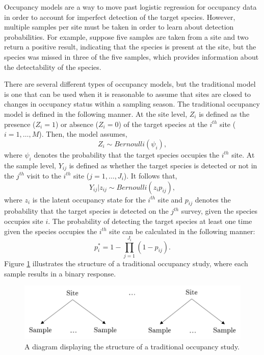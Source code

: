 \documentclass[12pt]{article}\usepackage[]{graphicx}\usepackage[]{color}
\begin{document}
Occupancy models are a way to move past logistic regression for occupancy data in order to account for imperfect detection of the target species. However, multiple samples per site must be taken in order to learn about detection probabilities. For example, suppose five samples are taken from a site and two return a positive result, indicating that the species is present at the site, but the species was missed in three of the five samples, which provides information about the detectability of the species. 

There are several different types of occupancy models, but the traditional model is one that can be used when it is reasonable to assume that sites are closed to changes in occupancy status within a sampling season. The traditional occupancy model is defined in the following manner. At the site level, $Z_i$ is defined as the presence ($Z_i = 1$) or absence ($Z_i = 0$) of the target species at the $i^{th}$ site ($i = 1, \dots, M$). Then, the model assumes, 
$$Z_i \sim Bernoulli(\psi_i),$$ 
\noindent where $\psi_i$ denotes the probability that the target species occupies the $i^{th}$ site. At the sample level, $Y_{ij}$ is defined as whether the target species is detected or not in the $j^{th}$ visit to the $i^{th}$ site ($j = 1, \dots, J_{i}$). It follows that, 
$$Y_{ij}|z_{ij} \sim Bernoulli(z_{i}p_{ij}),$$ 
\noindent where $z_i$ is the latent occupancy state for the $i^{th}$ site and $p_{ij}$ denotes the probability that the target species is detected on the $j^{th}$ survey, given the species occupies site $i$. The probability of detecting the target species at least one time given the species occupies the $i^{th}$ site can be calculated in the following manner:
$$p_i^* = 1 - \prod_{j = 1}^{J_i}(1 - p_{ij}).$$ 
\noindent Figure \ref{fig:ssocc} illustrates the structure of a traditional occupancy study, where each sample results in a binary response. 

\begin{figure}[]
	\centering
	\includegraphics[scale = 0.7]{images/ssocc}
	\caption{A diagram displaying the structure of a traditional occupancy study.}
	\label{fig:ssocc}
\end{figure}
\end{document}
